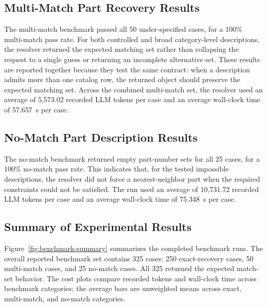 \documentclass[colorlinks,upint,subscriptcorrection,varvw,hyphenate,balance,nofoot]{asmeconf}
\begin{document}
\subsection{Multi-Match Part Recovery Results}

The multi-match benchmark passed all 50 under-specified cases, for a 100\% multi-match pass rate. For both controlled and broad category-level descriptions, the resolver returned the expected matching set rather than collapsing the request to a single guess or returning an incomplete alternative set. These results are reported together because they test the same contract: when a description admits more than one catalog row, the returned object should preserve the expected matching set. Across the combined multi-match set, the resolver used an average of 5,573.02 recorded LLM tokens per case and an average wall-clock time of 57.657~s per case.

\subsection{No-Match Part Description Results}

The no-match benchmark returned empty part-number sets for all 25 cases, for a 100\% no-match pass rate. This indicates that, for the tested impossible descriptions, the resolver did not force a nearest-neighbor part when the required constraints could not be satisfied. The run used an average of 10,731.72 recorded LLM tokens per case and an average wall-clock time of 75.348~s per case.

\subsection{Summary of Experimental Results}

Figure~\ref{fig:benchmark-summary} summarizes the completed benchmark runs. The overall reported benchmark set contains 325 cases: 250 exact-recovery cases, 50 multi-match cases, and 25 no-match cases. All 325 returned the expected match-set behavior. The cost plots compare recorded tokens and wall-clock time across benchmark categories; the average bars are unweighted means across exact, multi-match, and no-match categories.
\end{document}

